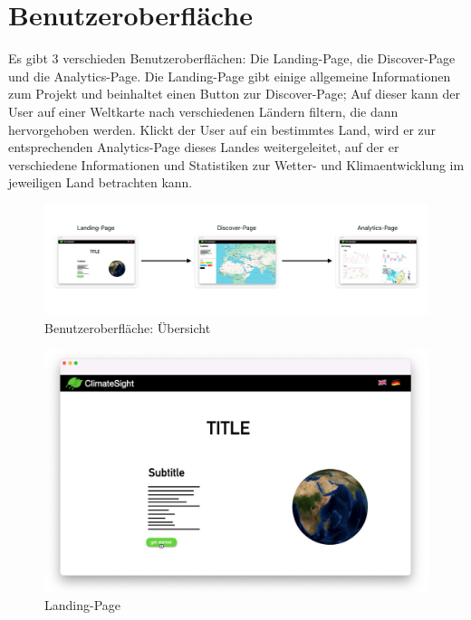 \documentclass[a4paper]{scrreprt}
\begin{document}
\chapter{Benutzeroberfläche}
Es gibt 3 verschieden Benutzeroberflächen: Die Landing-Page, die Discover-Page und die Analytics-Page. Die Landing-Page gibt einige allgemeine Informationen zum Projekt und beinhaltet einen Button zur Discover-Page; Auf dieser kann der User auf einer Weltkarte nach verschiedenen Ländern filtern, die dann hervorgehoben werden. Klickt der User auf ein bestimmtes Land, wird er zur entsprechenden Analytics-Page dieses Landes weitergeleitet, auf der er verschiedene Informationen und Statistiken zur Wetter- und Klimaentwicklung im jeweiligen Land betrachten kann.
\begin{figure}[ht]
    \centering
    \includegraphics[width=\textwidth]{Uebersicht.jpg}
    \caption{Benutzeroberfläche: Übersicht}
\end{figure}
\begin{figure}[ht]
    \centering
    \includegraphics[width=\textwidth]{Landingpage.jpg}
    \caption{Landing-Page}
\end{figure}
\end{document}
